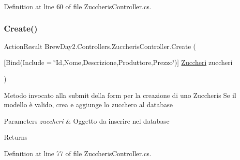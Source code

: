 Definition at line 60 of file Zuccheris\+Controller.\+cs.

\mbox{\label{class_brew_day2_1_1_controllers_1_1_zuccheris_controller_a6af10a8e51185ce8f4cf938c545d10c2}} 
\subsubsection{\texorpdfstring{Create()}{Create()}\hspace{0.1cm}{\footnotesize\ttfamily [2/2]}}
{\footnotesize\ttfamily Action\+Result Brew\+Day2.\+Controllers.\+Zuccheris\+Controller.\+Create (\begin{DoxyParamCaption}\item[{\mbox{[}\+Bind(\+Include = \char`\"{}\+Id,\+Nome,\+Descrizione,\+Produttore,\+Prezzo\char`\"{})\mbox{]} \mbox{\hyperlink{class_brew_day2_1_1_models_1_1_zuccheri}{Zuccheri}}}]{zuccheri }\end{DoxyParamCaption})}



Metodo invocato alla submit della form per la creazione di uno Zuccheris Se il modello è valido, crea e aggiunge lo zucchero al database 


\begin{DoxyParams}{Parameters}
{\em zuccheri} & Oggetto da inserire nel database\\
\hline
\end{DoxyParams}
\begin{DoxyReturn}{Returns}

\end{DoxyReturn}


Definition at line 77 of file Zuccheris\+Controller.\+cs.

\mbox{\label{class_brew_day2_1_1_controllers_1_1_zuccheris_controller_ac3ee0233b27ac4021c5d78838ea96e78}} 
